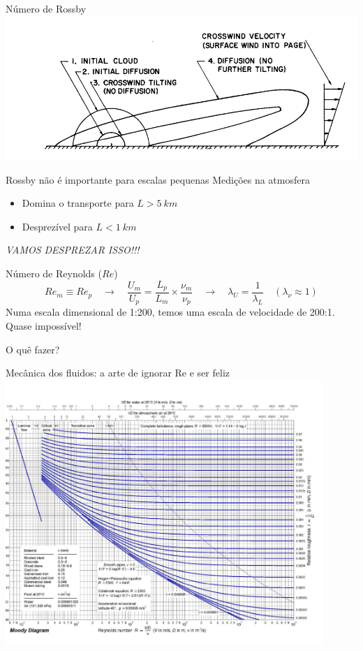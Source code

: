\documentclass{beamer}
\newcommand{\lra}{\ensuremath{\longrightarrow}}
\newcommand{\qrq}{\ensuremath{\quad\lra\quad}}
\begin{document}
\begin{frame}{Número de Rossby}
  \centering
  \includegraphics[width=\textwidth]{./figuras/coriolis.png}
\end{frame}



\begin{frame}{Rossby não é importante para escalas pequenas}
  Medições na atmosfera
\begin{itemize}
\item Domina o transporte para $L > 5\:km$
\item Desprezível para $L < 1\:km$
\end{itemize}

\emph{VAMOS DESPREZAR ISSO!!!}
\end{frame}


\begin{frame}{Número de Reynolds ($Re$)}
  \[
  Re_m \equiv Re_p \qrq \frac{U_m}{U_p} = \frac{L_p}{L_m} \times \frac{\nu_m}{\nu_p} \qrq \lambda_U =  \frac{1}{\lambda_L} \quad (\lambda_\nu\approx 1)
  \]
  Numa escala dimensional de 1:200, temos uma escala de velocidade de 200:1. Quase impossível!

  O quê fazer?
\end{frame}

\begin{frame}{Mecânica dos fluidos: a arte de ignorar Re e ser feliz}
  \centering
  \includegraphics[width=0.9\textwidth]{./figuras/moody.pdf}
  
\end{frame}
\end{document}
